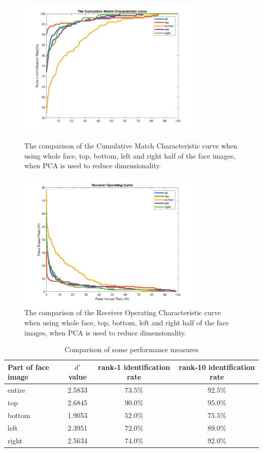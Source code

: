 \documentclass[a4paper]{article}
\begin{document}
\begin{spacing}{2.0}
	\begin{figure}[h]
	\begin{minipage}[t]{0.5\linewidth}
	\centering
	\includegraphics[width = 3.5in]{PCAinoneCMC.jpg}
	\caption{The comparison of the Cumulative Match Characteristic curve when using whole face, top, bottom, left and right half of the face images, when PCA is used to reduce dimensionality.}
	\label{cmcComPCA}
	\end{minipage}
	\begin{minipage}[t]{0.5\linewidth}
	\centering
	\includegraphics[width = 3.5in]{PCAinoneROC.jpg}
	\caption{The comparison of the Receiver Operating Characteristic curve when using whole face, top, bottom, left and right half of the face images, when PCA is used to reduce dimensionality.}
	\label{rocComPCA}
	\end{minipage}
	\end{figure}
	
	\begin{table}[h]
	\centering  
	\begin{tabular}{lccc}  
	\hline
	Part of face image & $d'$ value & rank-1 identification rate & rank-10 identification rate\\ \hline  
	entire & 2.5833 & $73.5\%$ & $92.5\%$\\         
	top & 2.6845 & $90.0\%$ & $95.0\%$\\      
	bottom &1.9053 & $52.0\%$ & $75.5\%$\\ 
	left &2.3951 & $72.0\%$ & $89.0\%$\\ 
	right &2.5634 & $74.0\%$ & $92.0\%$\\ \hline
	\end{tabular}
	\caption{Comparison of some performance measures}
	\label{comTablePCA}
	\end{table}
	

\end{spacing}
\end{document}
